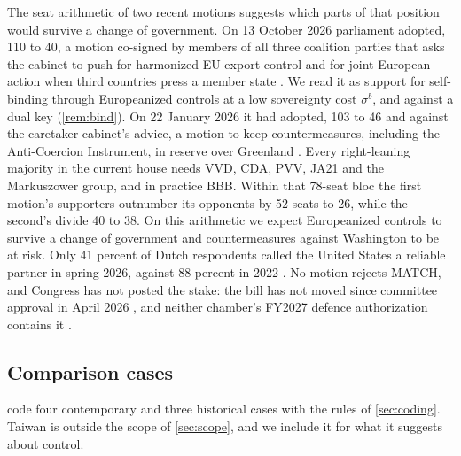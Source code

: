 The seat arithmetic of two recent motions suggests which parts of that position would survive a change of government. On 13 October 2026 parliament adopted, 110 to 40, a motion co-signed by members of all three coalition parties that asks the cabinet to push for harmonized EU export control and for joint European action when third countries press a member state \citep{kst37020xvii11}. We read it as support for self-binding through Europeanized controls at a low sovereignty cost $\sigma^b$, and against a dual key (\cref{rem:bind}). On 22 January 2026 it had adopted, 103 to 46 and against the caretaker cabinet's advice, a motion to keep countermeasures, including the Anti-Coercion Instrument, in reserve over Greenland \citep{kst21501_20_2364}. Every right-leaning majority in the current house needs VVD, CDA, PVV, JA21 and the Markuszower group, and in practice BBB. Within that 78-seat bloc the first motion's supporters outnumber its opponents by 52 seats to 26, while the second's divide 40 to 38. On this arithmetic we expect Europeanized controls to survive a change of government and countermeasures against Washington to be at risk. Only 41 percent of Dutch respondents called the United States a reliable partner in spring 2026, against 88 percent in 2022 \citep{pew2026usimage}. No motion rejects MATCH, and Congress has not posted the stake: the bill has not moved since committee approval in April 2026 \citep{hr8170}, and neither chamber's FY2027 defence authorization contains it \citep{hr8800eh, s4784rs}.

\subsection{Comparison cases}\label{sec:cases}

 code four contemporary and three historical cases with the rules of \cref{sec:coding}. Taiwan is outside the scope of \cref{sec:scope}, and we include it for what it suggests about control.

